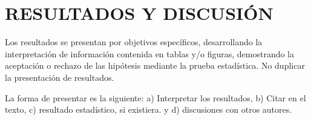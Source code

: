 \titlespacing{\chapter}{0pt}{120pt}{7pt}
\chapter{RESULTADOS Y DISCUSIÓN}
\label{cap:resultados}

Los resultados se presentan por objetivos específicos, desarrollando la interpretación de información contenida en tablas y/o figuras, demostrando la aceptación o rechazo de las hipótesis mediante la prueba estadística. No duplicar la presentación de resultados.

La forma de presentar es la siguiente: a) Interpretar los resultados, b) Citar en el texto, c) resultado estadístico, si existiera. y d) discusiones con otros autores.